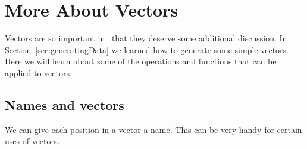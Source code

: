 \begin{knitrout}
\end{knitrout}


\section{More About Vectors}
\label{sec:Rvectors}
Vectors are so important in \R\ that they deserve some additional discussion.
In Section~\ref{sec:generatingData} we learned how to generate some simple
vectors.  Here we will learn about some of the operations and functions
that can be applied to vectors.

\subsection{Names and vectors}

We can give each position in a vector a name.  This can be very handy for certain uses
of vectors.

